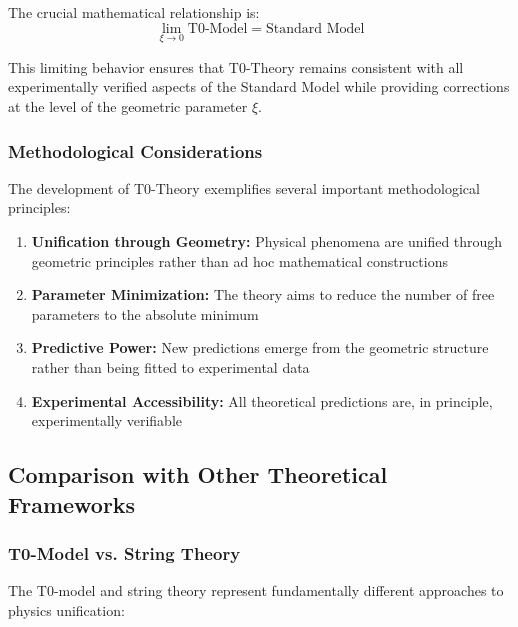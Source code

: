 \documentclass[12pt,a4paper]{article}
\theoremstyle{definition}
\begin{document}
	The crucial mathematical relationship is:
	\begin{equation}
		\boxed{\lim_{\xi \to 0} \text{T0-Model} = \text{Standard Model}}
	\end{equation}
	
	This limiting behavior ensures that T0-Theory remains consistent with all experimentally verified aspects of the Standard Model while providing corrections at the level of the geometric parameter $\xi$.
	
	\subsubsection{Methodological Considerations}
	
	The development of T0-Theory exemplifies several important methodological principles:
	
	\begin{enumerate}
		\item \textbf{Unification through Geometry:} Physical phenomena are unified through geometric principles rather than ad hoc mathematical constructions
		
		\item \textbf{Parameter Minimization:} The theory aims to reduce the number of free parameters to the absolute minimum
		
		\item \textbf{Predictive Power:} New predictions emerge from the geometric structure rather than being fitted to experimental data
		
		\item \textbf{Experimental Accessibility:} All theoretical predictions are, in principle, experimentally verifiable
	\end{enumerate}
	
	\subsection{Comparison with Other Theoretical Frameworks}
	
	\subsubsection{T0-Model vs. String Theory}
	
	The T0-model and string theory represent fundamentally different approaches to physics unification:
	
\end{document}
